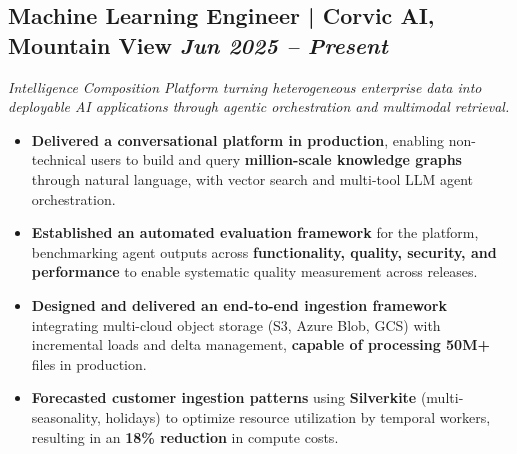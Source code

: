 \documentclass[10pt,a4paper]{article}
\begin{document}
\subsection{Machine Learning Engineer | Corvic AI, Mountain View \hfill
\textit{Jun 2025 -- Present}}
\textit{Intelligence Composition Platform turning heterogeneous enterprise data into deployable AI applications through agentic orchestration and multimodal retrieval.}
\begin{itemize}
    \item \textbf{Delivered a conversational platform in production}, enabling non-technical users to build and query \textbf{million-scale knowledge graphs} through natural language, with vector search and multi-tool LLM agent orchestration.

    \item \textbf{Established an automated evaluation framework} for the platform, benchmarking agent outputs across \textbf{functionality, quality, security, and performance} to enable systematic quality measurement across releases.
    \item \textbf{Designed and delivered an end-to-end ingestion framework} integrating multi-cloud object storage (S3, Azure Blob, GCS) with incremental loads and delta management, \textbf{capable of processing 50M+} files in production.
    \item \textbf{Forecasted customer ingestion patterns} using \textbf{Silverkite} (multi-seasonality, holidays) to optimize resource utilization by temporal workers, resulting in an \textbf{18\% reduction} in compute costs.

\end{itemize}
\vspace{0.3em}
\end{document}
